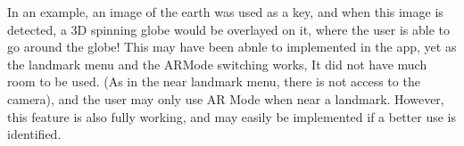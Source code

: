 In an example, an image of the earth was used as a key, and when this image is detected, a 3D spinning 
globe would be overlayed on it, where the user is able to go around the globe!
This may have been abnle to implemented in the app, yet as the landmark menu and the ARMode switching 
works, It did not have much room to be used. (As in the near landmark menu, there is 
not access to the camera), and the user may only use AR Mode when near a landmark. However, this 
feature is also fully working, and may easily be implemented if a better use is identified. 

